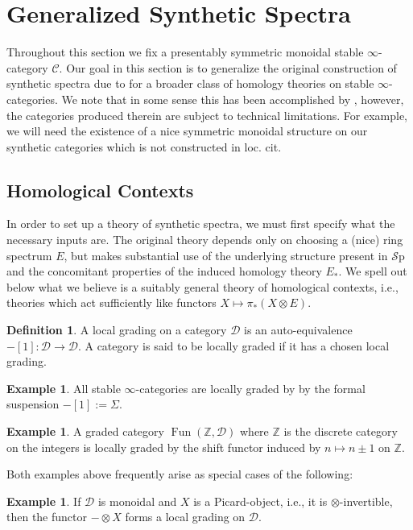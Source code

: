 \documentclass[10pt]{amsart}
\theoremstyle{definition}
\numberwithin{figure}{section}
\numberwithin{equation}{section}
\newtheorem{definition}[figure]{Definition}
\newtheorem{example}[figure]{Example}
\newcommand{\cC}{\mathcal{C}}
\newcommand{\cD}{\mathcal{D}}
\theoremstyle{cited}
\newcommand{\bZ}{\mathbb{Z}}
\newcommand{\Fun}{\operatorname{Fun}}
\newcommand{\Sp}{{\mathcal{S}\mathrm{p}}}
\begin{document}
\section{Generalized Synthetic Spectra}

Throughout this section we fix a presentably symmetric monoidal stable $\infty$-category $\cC$. Our goal in this section is to generalize the original construction of synthetic spectra due to \cite{Pst22} for a broader class of homology theories on stable $\infty$-categories. We note that in some sense this has been accomplished by \cite{PP23}, however, the categories produced therein are subject to technical limitations. For example, we will need the existence of a nice symmetric monoidal structure on our synthetic categories which is not constructed in loc. cit.

\subsection{Homological Contexts} In order to set up a theory of synthetic spectra, we must first specify what the necessary inputs are. The original theory depends only on choosing a (nice) ring spectrum $E$, but makes substantial use of the underlying structure present in $\Sp$ and the concomitant properties of the induced homology theory $E_*$. We spell out below what we believe is a suitably general theory of homological contexts, i.e., theories which act sufficiently like functors $X\mapsto \pi_*(X\otimes E)$.


\begin{definition}
  A local grading on a category $\cD$ is an auto-equivalence $-[1]:\cD\to \cD$. A category is said to be locally graded if it has a chosen local grading.
\end{definition}

\begin{example}
  All stable $\infty$-categories are locally graded by by the formal suspension $-[1]:=\Sigma$. 
\end{example}

\begin{example}
  A graded category $\Fun(\bZ,\cD)$ where $\bZ$ is the discrete category on the integers is locally graded by the shift functor induced by $n\mapsto n\pm 1$ on $\bZ$.
\end{example}

Both examples above frequently arise as special cases of the following:

\begin{example}
  If $\cD$ is monoidal and $X$ is a Picard-object, i.e., it is $\otimes$-invertible, then the functor $-\otimes X$ forms a local grading on $\cD$.
\end{example}
\end{document}
